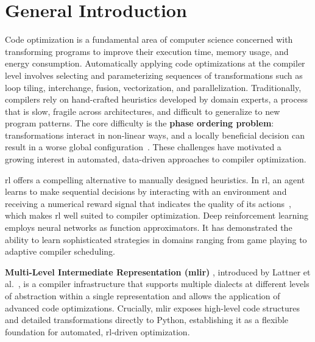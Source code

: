 \chapter*{General Introduction} %
\label{ch:introduction}

Code optimization is a fundamental area of computer science concerned with transforming programs to improve their execution time, memory usage, and energy consumption. Automatically applying code optimizations at the compiler level involves selecting and parameterizing sequences of transformations such as loop tiling, interchange, fusion, vectorization, and parallelization. Traditionally, compilers rely on hand-crafted heuristics developed by domain experts, a process that is slow, fragile across architectures, and difficult to generalize to new program patterns. The core difficulty is the \textbf{phase ordering problem}: transformations interact in non-linear ways, and a locally beneficial decision can result in a worse global configuration~\cite{touati2014phase}. These challenges have motivated a growing interest in automated, data-driven approaches to compiler optimization.

\gls{rl} offers a compelling alternative to manually designed heuristics. In \gls{rl}, an agent learns to make sequential decisions by interacting with an environment and receiving a numerical reward signal that indicates the quality of its actions~\cite{sutton2018reinforcement}, which makes \gls{rl} well suited to compiler optimization. Deep reinforcement learning employs neural networks as function approximators. It has demonstrated the ability to learn sophisticated strategies in domains  ranging from game playing to adaptive compiler scheduling.

\textbf{Multi-Level Intermediate Representation (\gls{mlir})} , introduced by Lattner et al.~\cite{lattner2021mlir}, is a compiler infrastructure that supports multiple dialects at different levels of abstraction within a single representation and allows the application of advanced code optimizations. Crucially, \gls{mlir} exposes high-level code structures and detailed transformations directly to Python, establishing it as a flexible foundation for automated, \gls{rl}-driven optimization.

